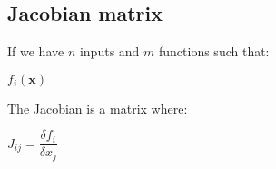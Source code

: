 
\subsection{Jacobian matrix}

If we have \(n\) inputs and \(m\) functions such that:

\(f_i(\mathbf x)\)

The Jacobian is a matrix where:

\(J_{ij}= \dfrac{\delta f_i}{\delta x_j}\)

